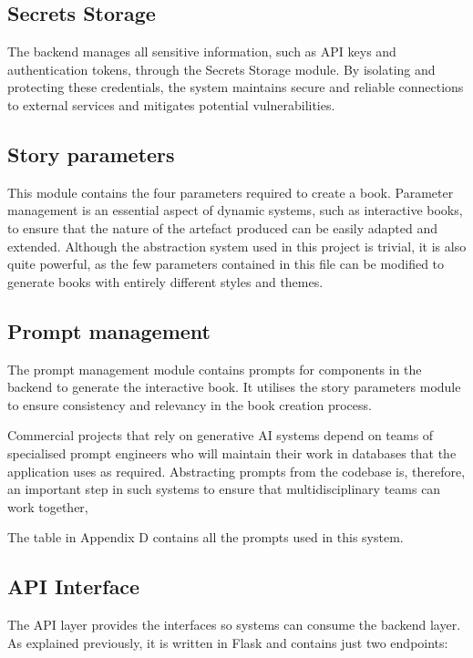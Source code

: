 \documentclass[conference]{IEEEtran}
\begin{document}
	\subsection{Secrets Storage}
	The backend manages all sensitive information, such as API keys and authentication tokens, through the Secrets Storage module. By isolating and protecting these credentials, the system maintains secure and reliable connections to external services and mitigates potential vulnerabilities. 
	
	\subsection{Story parameters}
	This module contains the four parameters required to create a book. Parameter management is an essential aspect of dynamic systems, such as interactive books, to ensure that the nature of the artefact produced can be easily adapted and extended. Although the abstraction system used in this project is trivial, it is also quite powerful, as the few parameters contained in this file can be modified to generate books with entirely different styles and themes.
	
	
	\subsection{Prompt management}
	The prompt management module contains prompts for components in the backend to generate the interactive book. It utilises the story parameters module to ensure consistency and relevancy in the book creation process. 
	
	Commercial projects that rely on generative AI systems depend on teams of specialised prompt engineers who will maintain their work in databases that the application uses as required. Abstracting prompts from the codebase is, therefore, an important step in such systems to ensure that multidisciplinary teams can work together,
	
	The table in Appendix D contains all the prompts used in this system.
	
	
	\subsection{API Interface}
	
	The API layer provides the interfaces so systems can consume the backend layer. As explained previously, it is written in Flask and contains just two endpoints:
	
\end{document}

